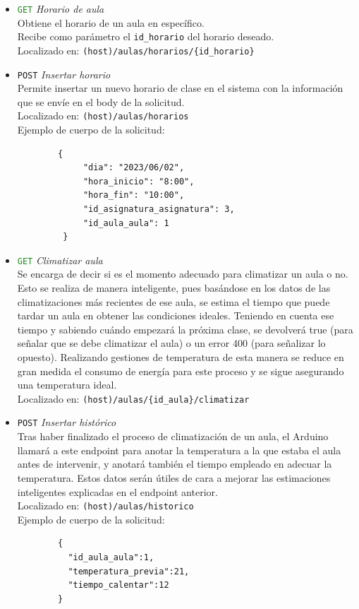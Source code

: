 \documentclass[12pt]{report}
\begin{document}
\begin{itemize}
\begin{itemize}
        \item \textcolor{ForestGreen}{\texttt{GET}} \textit{Horario de aula}\\
        Obtiene el horario de un aula en específico.\\
        Recibe como parámetro el \texttt{id\_horario} del horario deseado.\\
        Localizado en: \texttt{(host)/aulas/horarios/\{id\_horario\}}
    
        \item \textcolor{YellowOrange}{\texttt{POST}} \textit{Insertar horario}\\
        Permite insertar un nuevo horario de clase en el sistema con la información que se envíe en el body de la solicitud.\\
        Localizado en: \texttt{(host)/aulas/horarios}
            \\Ejemplo de cuerpo de la solicitud:
        \begin{verbatim}
        {
             "dia": "2023/06/02",
             "hora_inicio": "8:00",
             "hora_fin": "10:00",
             "id_asignatura_asignatura": 3,
             "id_aula_aula": 1
         }
        \end{verbatim}
        
        \item \textcolor{ForestGreen}{\texttt{GET}} \textit{Climatizar aula}\\
        Se encarga de decir si es el momento adecuado para climatizar un aula o no. Esto se realiza de manera inteligente, pues basándose en los datos de las climatizaciones más recientes de ese aula, se estima el tiempo que puede tardar un aula en obtener las condiciones ideales. Teniendo en cuenta ese tiempo y sabiendo cuándo empezará la próxima clase, se devolverá true (para señalar que se debe climatizar el aula) o un error 400 (para señalizar lo opuesto). Realizando gestiones de temperatura de esta manera se reduce en gran medida el consumo de energía para este proceso y se sigue asegurando una temperatura ideal.\\
        Localizado en: \texttt{(host)/aulas/\{id\_aula\}/climatizar}

        \item \textcolor{YellowOrange}{\texttt{POST}} \textit{Insertar histórico}\\
        Tras haber finalizado el proceso de climatización de un aula, el Arduino llamará a este endpoint para anotar la temperatura a la que estaba el aula antes de intervenir, y anotará también el tiempo empleado en adecuar la temperatura. Estos datos serán útiles de cara a mejorar las estimaciones inteligentes explicadas en el endpoint anterior.\\
        Localizado en: \texttt{(host)/aulas/historico}
            \\Ejemplo de cuerpo de la solicitud:
        \begin{verbatim}
        {
          "id_aula_aula":1,
          "temperatura_previa":21,
          "tiempo_calentar":12
        }
        \end{verbatim}
    \end{itemize}


\end{itemize}
\end{document}
